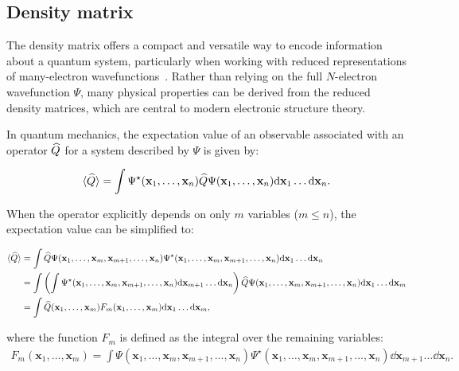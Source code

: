 \newpage
\subsection{Density matrix}

The density matrix offers a compact and versatile way to encode information
about a quantum system, particularly when working with reduced representations
of many-electron wavefunctions~\cite{Lwdin1955, McWeeny1960}. Rather than
relying on the full $N$-electron wavefunction $\Psi$, many physical properties
can be derived from the reduced density matrices, which are central to modern
electronic structure theory.

In quantum mechanics, the expectation value of an observable associated with an
operator $\widehat{Q}$ for a system described by $\Psi$ is given by:

\begin{align}
  \langle \widehat{Q} \rangle = \int\Psi^{\star}(\mathbf{x}_1,\dots,\mathbf{x}_n) \widehat{Q} \Psi(\mathbf{x}_1,\dots,\mathbf{x}_n)
    \dd\mathbf{x}_1 \dots \dd\mathbf{x}_n.
\end{align}

When the operator explicitly depends on only $m$ variables ($m \leq n$), the
expectation value can be simplified to:

\scriptsize
\begin{align}
  \langle \widehat{Q} \rangle & = \int\widehat{Q}\Psi
    (\mathbf{x}_1,\ldots , \mathbf{x}_m, \mathbf{x}_{m+1}, \ldots , \mathbf{x}_n)
    \Psi^{\star} (\mathbf{x}_1,\ldots ,\mathbf{x}_m, \mathbf{x}_{m+1}, \ldots , \mathbf{x}_n)
    \dd\mathbf{x}_1\ldots \dd\mathbf{x}_n \nonumber \\
	& = \int\left(\int
    \Psi^{\star}(\mathbf{x}_1,\ldots , \mathbf{x}_m, \mathbf{x}_{m+1}, \ldots , \mathbf{x}_n)
    \dd \mathbf{x}_{m+1}\ldots \dd \mathbf{x}_n \right)
    \widehat{Q} \Psi(\mathbf{x}_1,\ldots , \mathbf{x}_m, \mathbf{x}_{m+1}, \ldots , \mathbf{x}_n)
    \dd\mathbf{x}_1\ldots \dd\mathbf{x}_m \nonumber\\
	& =\int
    \widehat{Q} (\mathbf{x}_1, \ldots , \mathbf{x}_m) F_m
    (\mathbf{x}_1, \ldots , \mathbf{x}_m)
    \dd\mathbf{x}_1\ldots\dd\mathbf{x}_m,
\end{align}
\normalsize

\noindent where the function $F_m$ is defined as the integral over the remaining variables:
%
\footnotesize
\begin{align}
  F_m(\mathbf{x}_1, \ldots , \mathbf{x}_m) =
  \int\Psi(\mathbf{x}_1,\ldots , \mathbf{x}_m, \mathbf{x}_{m+1}, \ldots , \mathbf{x}_n)
    \Psi^{\star}(\mathbf{x}_1,\ldots , \mathbf{x}_m, \mathbf{x}_{m+1}, \ldots , \mathbf{x}_n)
    \dd \mathbf{x}_{m+1}\ldots \dd \mathbf{x}_n .
\end{align}
\normalsize

